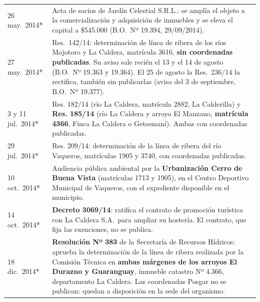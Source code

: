 \begin{longtable}{@{}p{2.7cm}p{10.3cm}@{}}
26 may.\ 2014* & Acta de socios de Jardín Celestial S.R.L.: se amplía el objeto a la comercialización y adquisición de inmuebles y se eleva el capital a \$545.000 (B.O.\ Nº 19.394, 29/09/2014). \\
27 may.\ 2014* & Res.\ 142/14: determinación de línea de ribera de los ríos Mojotoro y La Caldera, matrícula 3616, \textbf{sin coordenadas publicadas}. Su aviso sale recién el 13 y el 14 de agosto (B.O.\ Nº 19.363 y 19.364). El 25 de agosto la Res.\ 236/14 la rectifica, también sin publicarlas (aviso del 3 de septiembre, B.O.\ Nº 19.377). \\
3 y 11 jul.\ 2014* & Res. 182/14 (río La Caldera, matrícula 2882, La Calderilla) y \textbf{Res. 185/14} (río La Caldera y arroyo El Manzano, \textbf{matrícula 4366}, Finca La Caldera o Getsemaní). Ambas con coordenadas publicadas. \\
29 jul.\ 2014* & Res. 209/14: determinación de la línea de ribera del río Vaqueros, matrículas 1905 y 3740, con coordenadas publicadas. \\
10 oct.\ 2014* & Audiencia pública ambiental por la \textbf{Urbanización Cerro de Buena Vista} (matrículas 1713 y 1905), en el Centro Deportivo Municipal de Vaqueros, con el expediente disponible en el municipio. \\
14 oct.\ 2014* & \textbf{Decreto 3069/14}: ratifica el contrato de promoción turística con La Caldera S.A.\ para ampliar su hostería. El contrato, que fija las exenciones, no se publica. \\
18 dic.\ 2014* & \textbf{Resolución Nº 383} de la Secretaría de Recursos Hídricos: aprueba la determinación de la línea de ribera realizada por la Comisión Técnica en \textbf{ambas márgenes de los arroyos El Durazno y Guaranguay}, inmueble catastro Nº 4.366, departamento La Caldera. Las coordenadas Posgar no se publican: quedan a disposición en la sede del organismo. \\

\end{longtable}
